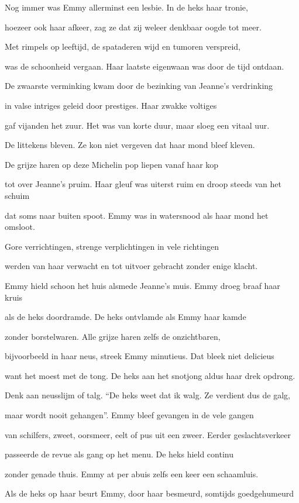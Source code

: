 Nog immer was Emmy
allerminst een lesbie.
In de heks haar tronie,

hoezeer ook haar afkeer,
zag ze dat zij weleer
denkbaar oogde tot meer.

Met rimpels op leeftijd,
de spataderen wijd
en tumoren verspreid,

was de schoonheid vergaan.
Haar laatste eigenwaan
was door de tijd ontdaan.

De zwaarste verminking
kwam door de bezinking
van Jeanne’s verdrinking

in valse intriges
geleid door prestiges.
Haar zwakke voltiges

gaf vijanden het zuur.
Het was van korte duur,
maar sloeg een vitaal uur.

De littekens bleven.
Ze kon niet vergeven
dat haar mond bleef kleven.

De grijze haren op
deze Michelin pop
liepen vanaf haar kop

tot over Jeanne’s pruim.
Haar gleuf was uiterst ruim
en droop steeds van het schuim

dat soms naar buiten spoot.
Emmy was in watersnood
als haar mond het omsloot.

Gore verrichtingen,
strenge verplichtingen
in vele richtingen

werden van haar verwacht
en tot uitvoer gebracht
zonder enige klacht.

Emmy hield schoon het huis alsmede Jeanne’s muis.
Emmy droeg braaf haar kruis

als de heks doordramde.
De heks ontvlamde
als Emmy haar kamde

zonder borstelwaren.
Alle grijze haren
zelfs de onzichtbaren,

bijvoorbeeld in haar neus,
streek Emmy minutieus.
Dat bleek niet delicieus

want het moest met de tong. De heks aan het snotjong
aldus haar drek opdrong.

Denk aan neusslijm of talg.
“De heks weet dat ik walg.
Ze verdient dus de galg,

maar wordt nooit gehangen”.
Emmy bleef gevangen
in de vele gangen

van schilfers, zweet, oorsmeer,
eelt of pus uit een zweer.
Eerder geslachtsverkeer

passeerde de revue
als gang op het menu.
De heks hield continu

zonder genade thuis.
Emmy at per abuis
zelfs een keer een schaamluis.

Als de heks op haar beurt
Emmy, door haar besmeurd,
somtijds goedgehumeurd

